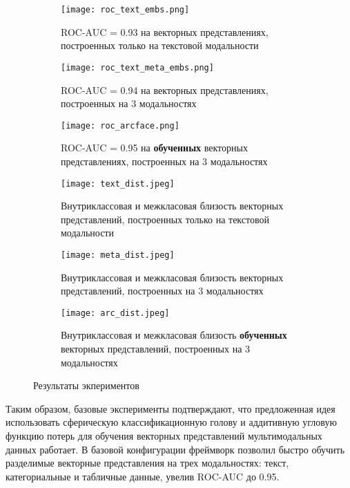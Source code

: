 \documentclass{article}
\begin{document}
\begin{figure}[ht]
  \centering
  \begin{subfigure}{0.3\textwidth}
    \centering
    \texttt{[image: roc\_text\_embs.png]}
    \caption{ROC-AUC = 0.93 на векторных представлениях, построенных только на текстовой модальности}
    \label{fig:dist_text}
  \end{subfigure}
  \hfill
  \begin{subfigure}{0.3\textwidth}
    \centering
    \texttt{[image: roc\_text\_meta\_embs.png]}
    \caption{ROC-AUC = 0.94 на векторных представлениях, построенных на 3 модальностях}
    \label{fig:roc_meta}
  \end{subfigure}%
  \hfill
  \begin{subfigure}{0.3\textwidth}
    \centering
    \texttt{[image: roc\_arcface.png]}
    \caption{ROC-AUC = 0.95 на \textbf{обученных} векторных представлениях, построенных на 3 модальностях}
    \label{fig:roc_arc}
  \end{subfigure}

  \medskip %

  \begin{subfigure}{0.3\textwidth}
    \centering
    \texttt{[image: text\_dist.jpeg]}
    \caption{Внутриклассовая и межкласовая близость векторных представлений, построенных только на текстовой модальности}
    \label{fig:dist_text_meta}
  \end{subfigure}%
  \hfill
  \begin{subfigure}{0.3\textwidth}
    \centering
    \texttt{[image: meta\_dist.jpeg]}
    \caption{Внутриклассовая и межкласовая близость векторных представлений, построенных на 3 модальностях}
    \label{fig:dist_meta}
  \end{subfigure}%
  \hfill
  \begin{subfigure}{0.3\textwidth}
    \centering
    \texttt{[image: arc\_dist.jpeg]}
    \caption{Внутриклассовая и межкласовая близость \textbf{обученных} векторных представлений, построенных на 3 модальностях}
    \label{fig:dist_arc}
  \end{subfigure}
  \caption{Результаты экпериментов}
  \label{fig:exp_res}
\end{figure}
Таким образом, базовые эксперименты подтверждают, что предложенная идея использовать сферическую классификационную голову и аддитивную угловую функцию потерь для обучения векторных представлений мультимодальных данных работает. В базовой конфигурации фреймворк позволил быстро обучить разделимые векторные представления на трех модальностях: текст, категориальные и табличные данные, увелив ROC-AUC до 0.95.
\end{document}
